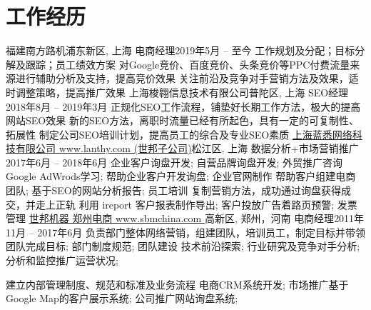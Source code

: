 \section{\textbf{工作经历}}
  \resumeSubHeadingListStart
    \resumeSubheading
      {福建南方路机}{浦东新区, 上海}
      {电商经理}{2019年5月 -- 至今}
      \resumeItemListStart
          {工作规划及分配；目标分解及跟踪；员工绩效方案}
          {对Google竞价、百度竞价、头条竞价等PPC付费流量来源进行辅助分析及支持，提高竞价效果}
          {关注前沿及竞争对手营销方法及效果，适时调整策略，提高推广效果}
      \resumeItemListEnd
    \resumeSubheading
      {上海梭翱信息技术有限公司}{普陀区, 上海} %
      {SEO经理}{2018年8月 -- 2019年3月}
      \resumeItemListStart
          {正规化SEO工作流程，铺垫好长期工作方法，极大的提高网站SEO效果}
          {新的SEO方法，离职时流量已经有所起色，具有一定的可复制性、拓展性}
          {制定公司SEO培训计划，提高员工的综合及专业SEO素质}
      \resumeItemListEnd
    \resumeSubheading
      {\href{http://www.lanthy.com/}{上海蓝悉网络科技有限公司 www.lanthy.com (世邦子公司)}}{松江区, 上海}
      {数据分析+市场营销推广}{2017年6月 -- 2018年6月}
      \resumeItemListStart
          {企业客户询盘开发; 自营品牌询盘开发; 外贸推广咨询}
          {Google AdWrods学习; 帮助企业客户开发询盘; 企业官网制作}
          {帮助客户组建电商团队; 基于SEO的网站分析报告; 员工培训}
          {复制营销方法，成功通过询盘获得成交，并走上正轨}
          {利用 ireport 客户报表制作导出; 客户投放广告着路页预警; 发票管理}
      \resumeItemListEnd
    \resumeSubheading
      {\href{http://www.sbmchina.com/}{世邦机器 郑州电商 www.sbmchina.com }}{高新区, 郑州，河南}
      {电商经理}{2011年11月 -- 2017年6月}
      \resumeItemListStart
          {负责部门整体网络营销，组建团队，培训员工，制定目标并带领团队完成目标; 部门制度规范; 团队建设}
          {技术前沿探索; 行业研究及竞争对手分析; 分析和监控推广运营状况;}

          {建立内部管理制度、规范和标准及业务流程}
          {电商CRM系统开发; 市场推广基于Google Map的客户展示系统; 公司推广网站询盘系统; }

